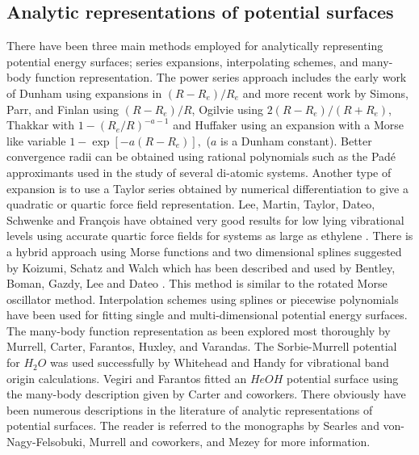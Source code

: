 \documentclass[12pt,thmsa]{article}
\begin{document}
\subsection{Analytic representations of potential surfaces}

There have been three main methods employed for analytically representing
potential energy surfaces; series expansions, interpolating schemes, and
many-body function representation. The power series approach includes the
early work of Dunham\cite{Dunham32a,Dunham32b} using expansions in $%
(R-R_e)/R_e$ and more recent work by Simons, Parr, and Finlan\cite{Simons73}
using $(R-R_e)/R$, Ogilvie\cite{Ogilvie81} using $2\left( R-R_e\right)
/\left( R+R_e\right) $, Thakkar\cite{Thakkar75} with $1-(R_e/R)^{-a-1}$ and
Huffaker\cite{Huffaker76} using an expansion with a Morse\cite{Morse29} like
variable $1-\exp \left[ -a\left( R-R_e\right) \right] ,$ ($a$ is a Dunham
constant). Better convergence radii can be obtained using rational
polynomials such as the Pad\'{e} approximants used in the study of several
di-atomic systems\cite{Jordan74,Jorish79,Sonnleitner81,Pardo86}. Another
type of expansion is to use a Taylor series obtained by numerical
differentiation to give a quadratic or quartic force field representation.
Lee, Martin, Taylor, Dateo, Schwenke and Fran\c{c}ois have obtained very
good results for low lying vibrational levels using accurate quartic force
fields\cite{Lee95a,Dateo94,Martin93,Lee95b} for systems as large as ethylene
\cite{Martin95}. There is a hybrid approach using Morse functions and two
dimensional splines suggested by Koizumi, Schatz and Walch\cite{Koizumi91}
which has been described and used by Bentley, Boman, Gazdy, Lee and Dateo
\cite{Bentley92}. This method is similar to the rotated Morse oscillator
method\cite{Bowman75,Connor75}. Interpolation schemes using splines or
piecewise polynomials have been used for fitting single and
multi-dimensional potential energy surfaces\cite
{Forsythe77,Malik80,Sathyamurthy75,Dunne87,Bruehl88}. The many-body function
representation as been explored most thoroughly by Murrell, Carter,
Farantos, Huxley, and Varandas\cite{Murrell84}. The Sorbie-Murrell\cite
{Sorbie75} potential for $H_2O$ was used successfully by Whitehead and Handy
\cite{Whitehead76} for vibrational band origin calculations. Vegiri and
Farantos\cite{Vergiri88} fitted an $HeOH$ potential surface using the
many-body description given by Carter and coworkers\cite{Carter82}. There
obviously have been numerous descriptions in the literature of analytic
representations of potential surfaces. The reader is referred to the
monographs by Searles and von-Nagy-Felsobuki\cite{Searles93}, Murrell and
coworkers\cite{Murrell84}, and Mezey\cite{Mezey87} for more information.
\end{document}
